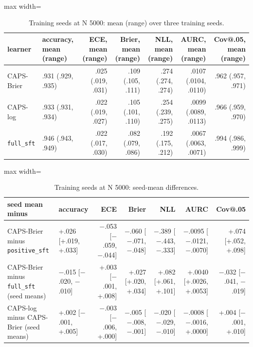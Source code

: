 \documentclass[10pt,letterpaper]{article}
\theoremstyle{plain}
\begin{document}
\begin{table}[H]
\centering
\footnotesize
\setlength{\tabcolsep}{3pt}
\caption{Training seeds at N 5000: mean (range) over three training seeds.}
\label{tab:A2}
\begin{adjustbox}{max width=\textwidth}
\begin{tabular}{llrrrrr}
\toprule
learner & accuracy, mean (range) & ECE, mean (range) & Brier, mean (range) & NLL, mean (range) & AURC, mean (range) & Cov@.05, mean (range) \\
\midrule
CAPS-Brier & .931 (.929, .935) & .025 (.019, .031) & .109 (.105, .111) & .274 (.274, .274) & .0107 (.0104, .0110) & .962 (.957, .971) \\
CAPS-log & .933 (.931, .934) & .022 (.019, .027) & .105 (.101, .110) & .254 (.239, .275) & .0099 (.0089, .0113) & .966 (.959, .970) \\
\texttt{full\_sft} & .946 (.943, .949) & .022 (.017, .030) & .082 (.079, .086) & .192 (.175, .212) & .0067 (.0063, .0071) & .994 (.986, .999) \\
\bottomrule
\end{tabular}
\end{adjustbox}
\end{table}

\begin{table}[H]
\centering
\footnotesize
\setlength{\tabcolsep}{3pt}
\caption{Training seeds at N 5000: seed-mean differences.}
\label{tab:A2b}
\begin{adjustbox}{max width=\textwidth}
\begin{tabular}{llrrrrr}
\toprule
seed mean minus & accuracy & ECE & Brier & NLL & AURC & Cov@.05 \\
\midrule
CAPS-Brier minus \texttt{positive\_sft} & +.026 [+.019, +.033] & $-$.053 [$-$.059, $-$.044] & $-$.060 [$-$.071, $-$.048] & $-$.389 [$-$.443, $-$.333] & $-$.0095 [$-$.0121, $-$.0070] & +.074 [+.052, +.098] \\
CAPS-Brier minus \texttt{full\_sft} (seed means) & $-$.015 [$-$.020, $-$.010] & +.003 [$-$.001, +.008] & +.027 [+.020, +.034] & +.082 [+.061, +.101] & +.0040 [+.0026, +.0053] & $-$.032 [$-$.041, $-$.019] \\
CAPS-log minus CAPS-Brier (seed means) & +.002 [$-$.001, +.005] & $-$.003 [$-$.006, +.000] & $-$.005 [$-$.008, $-$.001] & $-$.020 [$-$.029, $-$.010] & $-$.0008 [$-$.0016, +.0000] & +.004 [$-$.001, +.010] \\
\bottomrule
\end{tabular}
\end{adjustbox}
\end{table}
\end{document}
